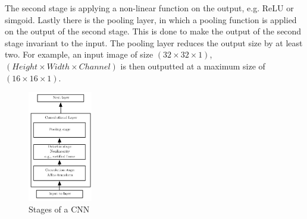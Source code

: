   The second stage is applying a non-linear function on the output, e.g. ReLU or simgoid.
  Lastly there is the pooling layer, in which a pooling function is applied on the output of the second stage. This is done to make the output of the second
  stage invariant to the input. The pooling layer reduces the output size by at least two. For example, an input image of size $(32 \times 32 \times 1)$,
  $(Height \times Width \times Channel)$ is then outputted at a maximum size of $(16 \times 16 \times 1)$.
  \begin{figure}[H]
   \includegraphics[width=0.25\textwidth]{../Images/convlayer.png}
   \centering
   \caption{Stages of a CNN \cite{Goodfellow2016}}
   \label{fig:cnn_stage}
  \end{figure}
  
